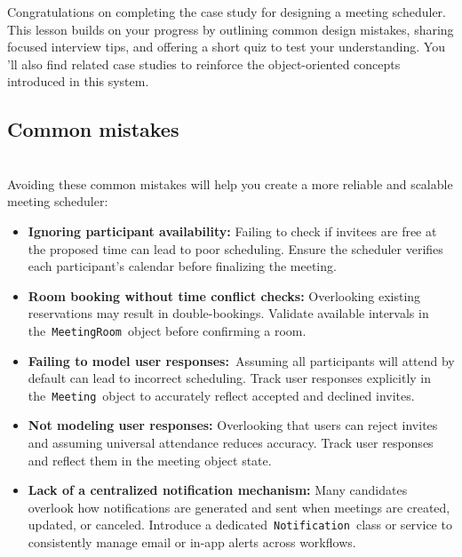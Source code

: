 

Congratulations on completing the case study for designing a meeting scheduler. This lesson builds on your progress by outlining common design mistakes, sharing focused interview tips, and offering a short quiz to test your understanding. You 'll also find related case studies to reinforce the object-oriented concepts introduced in this system.

\subsection{Common mistakes}\label{Common-mistakes}
\\
Avoiding these common mistakes will help you create a more reliable and scalable meeting scheduler:

\begin{itemize}
\item
\protect{}\label{_pJYBRNVyqjTLGctLzxeW}
\textbf{Ignoring participant availability:} Failing to check if invitees are free at the proposed time can lead to poor scheduling. Ensure the scheduler verifies each participant's calendar before finalizing the meeting.
\item
\protect{}\label{AzcekQRLis87mqF-VKf28}
\textbf{Room booking without time conflict checks:} Overlooking existing reservations may result in double-bookings. Validate available intervals in the~\texttt{MeetingRoom}~object before confirming a room.
\item
\protect{}\label{IVlMVje_1Bs1mgbhCwU6R}
\textbf{Failing to model user responses:}~Assuming all participants will attend by default can lead to incorrect scheduling. Track user responses explicitly in the~\texttt{Meeting}~object to accurately reflect accepted and declined invites.
\item
\protect{}\label{AJ3xKqo7PP77vzew7q2hO}
\textbf{Not modeling user responses:} Overlooking that users can reject invites and assuming universal attendance reduces accuracy. Track user responses and reflect them in the meeting object state.
\item
\protect{}\label{YzqrTatUpocz7nyvy4nXh}
\textbf{Lack of a centralized notification mechanism:} Many candidates overlook how notifications are generated and sent when meetings are created, updated, or canceled. Introduce a dedicated~\texttt{Notification}~class or service to consistently manage email or in-app alerts across workflows.
\end{itemize}

